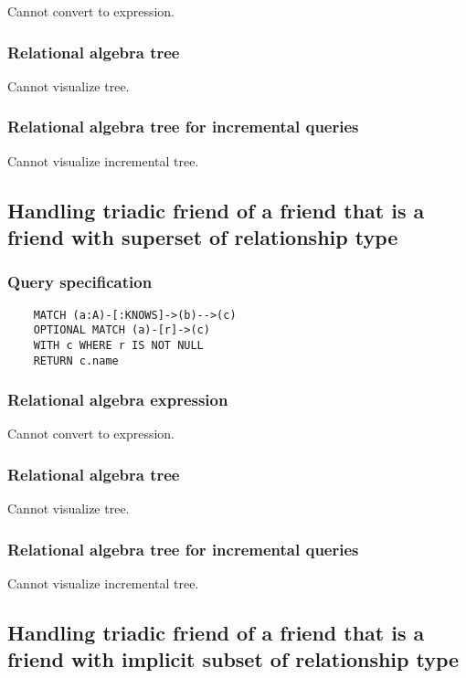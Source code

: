 	Cannot convert to expression.

	\subsubsection*{Relational algebra tree}

	Cannot visualize tree.

	\subsubsection*{Relational algebra tree for incremental queries}

	Cannot visualize incremental tree.
	\subsection{Handling triadic friend of a friend that is a friend with superset of relationship type}

	\subsubsection*{Query specification}

	\begin{lstlisting}
	MATCH (a:A)-[:KNOWS]->(b)-->(c)
	OPTIONAL MATCH (a)-[r]->(c)
	WITH c WHERE r IS NOT NULL
	RETURN c.name
	\end{lstlisting}


	\subsubsection*{Relational algebra expression}

	Cannot convert to expression.

	\subsubsection*{Relational algebra tree}

	Cannot visualize tree.

	\subsubsection*{Relational algebra tree for incremental queries}

	Cannot visualize incremental tree.
	\subsection{Handling triadic friend of a friend that is a friend with implicit subset of relationship type}


